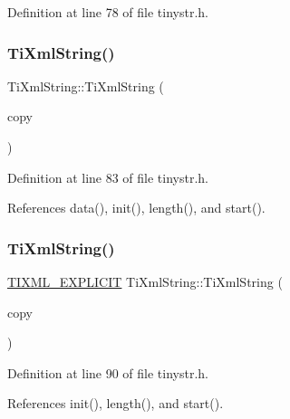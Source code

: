 Definition at line 78 of file tinystr.\+h.

\hypertarget{class_ti_xml_string_ac80fe17693a438c9ab2591664743fcb6}{}\label{class_ti_xml_string_ac80fe17693a438c9ab2591664743fcb6} 
\subsubsection{\texorpdfstring{Ti\+Xml\+String()}{TiXmlString()}\hspace{0.1cm}{\footnotesize\ttfamily [2/4]}}
{\footnotesize\ttfamily Ti\+Xml\+String\+::\+Ti\+Xml\+String (\begin{DoxyParamCaption}\item[{const \hyperlink{class_ti_xml_string}{Ti\+Xml\+String} \&}]{copy }\end{DoxyParamCaption})\hspace{0.3cm}{\ttfamily [inline]}}



Definition at line 83 of file tinystr.\+h.



References data(), init(), length(), and start().

\hypertarget{class_ti_xml_string_aa3b32bd2891a757c9f36c21db44c81d2}{}\label{class_ti_xml_string_aa3b32bd2891a757c9f36c21db44c81d2} 
\subsubsection{\texorpdfstring{Ti\+Xml\+String()}{TiXmlString()}\hspace{0.1cm}{\footnotesize\ttfamily [3/4]}}
{\footnotesize\ttfamily \hyperlink{tinystr_8h_ae341476cd6b94ee32e3e93110a759581}{T\+I\+X\+M\+L\+\_\+\+E\+X\+P\+L\+I\+C\+IT} Ti\+Xml\+String\+::\+Ti\+Xml\+String (\begin{DoxyParamCaption}\item[{const char $\ast$}]{copy }\end{DoxyParamCaption})\hspace{0.3cm}{\ttfamily [inline]}}



Definition at line 90 of file tinystr.\+h.



References init(), length(), and start().

